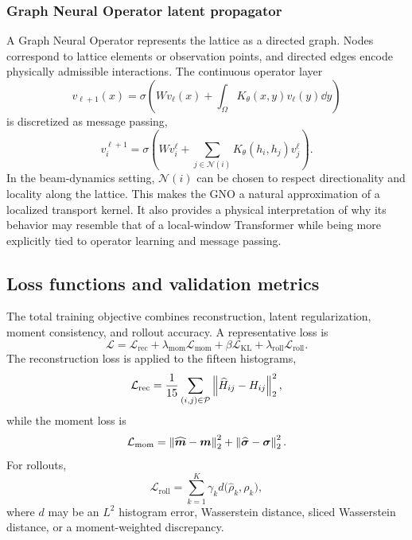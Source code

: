 \subsubsection{Graph Neural Operator latent propagator}
A Graph Neural Operator represents the lattice as a directed graph. Nodes correspond to lattice elements or observation points, and directed edges encode physically admissible interactions. The continuous operator layer
\begin{equation}
    v_{\ell+1}(x)=\sigma\left(Wv_{\ell}(x)+\int_{\Omega}K_{\theta}(x,y)v_{\ell}(y)\dd y\right)
\end{equation}
is discretized as message passing,
\begin{equation}
    v_i^{\ell+1}=\sigma\left(Wv_i^{\ell}+\sum_{j\in\mathcal{N}(i)}K_{\theta}(h_i,h_j)v_j^{\ell}\right).
    \label{eq:gno_message_passing_revised}
\end{equation}
In the beam-dynamics setting, $\mathcal{N}(i)$ can be chosen to respect directionality and locality along the lattice. This makes the GNO a natural approximation of a localized transport kernel. It also provides a physical interpretation of why its behavior may resemble that of a local-window Transformer while being more explicitly tied to operator learning and message passing.

\subsection{Loss functions and validation metrics}
The total training objective combines reconstruction, latent regularization, moment consistency, and rollout accuracy. A representative loss is
\begin{equation}
    \mathcal{L}=\mathcal{L}_{\mathrm{rec}}+\lambda_{\mathrm{mom}}\mathcal{L}_{\mathrm{mom}}+\beta\mathcal{L}_{\mathrm{KL}}+\lambda_{\mathrm{roll}}\mathcal{L}_{\mathrm{roll}}.
    \label{eq:global_loss_revised}
\end{equation}
The reconstruction loss is applied to the fifteen histograms,
\begin{equation}
    \mathcal{L}_{\mathrm{rec}}=\frac{1}{15}\sum_{(i,j)\in\mathcal{P}}\left\lVert\widehat{H}_{ij}-H_{ij}\right\rVert_{2}^{2},
\end{equation}
while the moment loss is
\begin{equation}
    \mathcal{L}_{\mathrm{mom}}=\left\lVert\widehat{\bm m}-\bm m\right\rVert_{2}^{2}+\left\lVert\widehat{\bm\sigma}-\bm\sigma\right\rVert_{2}^{2}.
\end{equation}
For rollouts,
\begin{equation}
    \mathcal{L}_{\mathrm{roll}}=\sum_{k=1}^{K}\gamma_k d\big(\widehat{\rho}_k,\rho_k\big),
\end{equation}
where $d$ may be an $L^2$ histogram error, Wasserstein distance, sliced Wasserstein distance, or a moment-weighted discrepancy.

